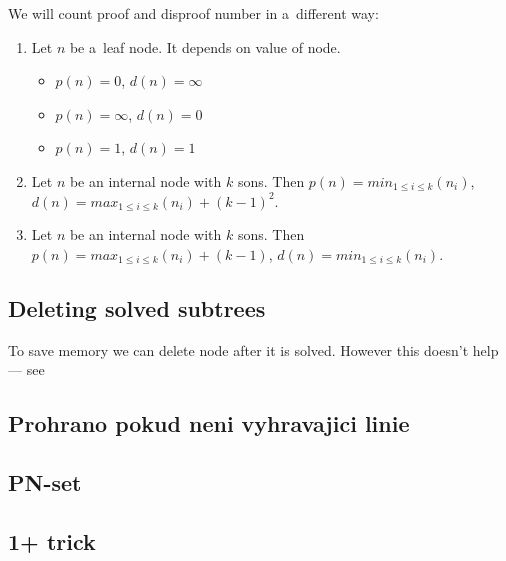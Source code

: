 We will count proof and disproof number in a~different way:
\begin{enumerate} 
	\item Let $n$ be a~leaf node. It depends on value of node.
		\begin{itemize}
			\item \value{true} $p(n)=0$, $d(n)=\infty$
			\item \value{false} $p(n)=\infty$, $d(n)=0$
			\item \value{unknown} $p(n)=1$, $d(n)=1$
		\end{itemize}
	\item Let $n$ be an internal  node with $k$ sons. Then \newline
		$p(n) = min_{1 \le i \le k}(n_i)$, \newline
		$d(n) = max_{1 \le i \le k}(n_i) + (k-1)^2$. 
	\item Let $n$ be an internal  node with $k$ sons. Then \newline
		$p(n) = max_{1 \le i \le k}(n_i) + (k-1)$, \newline 
		$d(n) = min_{1 \le i \le k}(n_i)$.
\end{enumerate}
		
\subsection{Deleting solved subtrees} \label{delete}

To save memory we can delete node after it is solved. However this doesn't 
help --- see 

\subsection{ Prohrano pokud neni vyhravajici linie} \label{nofreeK4}

\subsection{PN-set}

\subsection{1+ trick}



